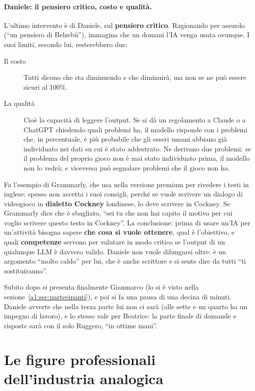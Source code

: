 \paragraph{Daniele: il pensiero critico, costo e qualità.} L'ultimo intervento
è di Daniele, sul \textbf{pensiero critico}. Ragionando per assurdo (``un
pensiero di Belzebù''), immagina che un domani l'IA venga usata ovunque. I suoi
limiti, secondo lui, resterebbero due:
\begin{description}
  \item[Il costo] Tutti dicono che sta diminuendo e che diminuirà, ma non se ne
        può essere sicuri al 100\%.
  \item[La qualità] Cioè la capacità di leggere l'output. Se si dà un regolamento
        a Claude o a ChatGPT chiedendo quali problemi ha, il modello risponde con
        i problemi che, in percentuale, è più probabile che gli esseri umani
        abbiano già individuato nei dati su cui è stato addestrato. Ne derivano
        due problemi: se il problema del proprio gioco non è mai stato
        individuato prima, il modello non lo vedrà; e viceversa può segnalare
        problemi che il gioco non ha.
\end{description}
Fa l'esempio di Grammarly, che usa nella versione premium per rivedere i testi
in inglese: spesso non accetta i suoi consigli, perché se vuole scrivere un
dialogo di videogioco in \textbf{dialetto Cockney} londinese, lo deve scrivere
in Cockney. Se Grammarly dice che è sbagliato, ``sei tu che non hai capito il
motivo per cui voglio scrivere questo testo in Cockney''. La conclusione: prima
di usare un'IA per un'attività bisogna sapere \textbf{che cosa si vuole
ottenere}, qual è l'obiettivo, e quali \textbf{competenze} servono per valutare
in modo critico se l'output di un qualunque LLM è davvero valido. Daniele non
vuole dilungarsi oltre: è un argomento ``molto caldo'' per lui, che è anche
scrittore e si sente dire da tutti ``ti sostituiranno''.

Subito dopo si presenta finalmente Gianmarco (lo si è visto nella
sezione~\ref{a1:sec:partecipanti}), e poi si fa una pausa di una decina di
minuti. Daniele avverte che nella terza parte lui non ci sarà (alle sette e un
quarto ha un impegno di lavoro), e lo stesso vale per Beatrice: la parte finale
di domande e risposte sarà con il solo Ruggero, ``in ottime mani''.

\section{Le figure professionali dell'industria analogica}
\label{a1:sec:figure}

